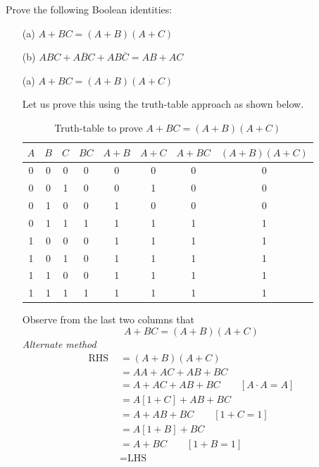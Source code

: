 \begin{example}\label{exam6.25}
Prove the following Boolean identities:
\begin{itemize}
\item[(a)] $A+BC=(A+B)(A+C)$

\item[(b)] $ABC+A\overline{B}C+AB\overline{C}=AB+AC$
\end{itemize}
\end{example}

\begin{solution}
\begin{itemize}
\item[(a)] $A+BC=(A+B)(A+C)$

Let us prove this using the truth-table approach as shown below.
\begin{table}[H]
\centering
\caption*{Truth-table to prove $A+BC=(A+B)(A+C)$}
\tabcolsep=6pt
\renewcommand{\arraystretch}{1.15}
\begin{tabular}{|cccc|c|c|c|c|}
\hline
\boldmath$A$ & \boldmath$B$ & \boldmath$C$ & \boldmath$BC$ & \boldmath$A+B$ & \boldmath$A+C$ & \boldmath$A+BC$ & \boldmath$(A+B)(A+C)$\\
\hline
0 & 0 & 0 & 0 & 0 & 0 & 0 & 0\\
0 & 0 & 1 & 0 & 0 & 1 & 0 & 0\\
0 & 1 & 0 & 0 & 1 & 0 & 0 & 0\\
0 & 1 & 1 & 1 & 1 & 1 & 1 & 1\\
1 & 0 & 0 & 0 & 1 & 1 & 1 & 1\\
1 & 0 & 1 & 0 & 1 & 1 & 1 & 1\\
1 & 1 & 0 & 0 & 1 & 1 & 1 & 1\\
1 & 1 & 1 & 1 & 1 & 1 & 1 & 1\\
\hline
\end{tabular}
\end{table}

Observe from the last two columns that
$$
A+BC=(A+B)(A+C)
$$
{\em Alternate method}
\begin{align*}
\text{RHS } &= (A+B)(A+C)\\[2pt]
&= AA+AC+AB+BC\\[2pt]
&= A+AC+AB+BC\qquad [A\cdot A=A]\\[2pt]
&= A[1+C]+AB+BC\\[2pt]
&= A+AB+BC\qquad [1+C=1]\\[2pt]
&= A[1+B]+BC\\[2pt]
&= A+BC\qquad [1+B=1]\\[2pt]
&= \text{LHS}
\end{align*}


\end{itemize}
\end{solution}
